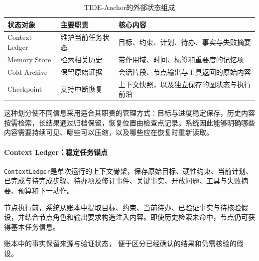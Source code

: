 \begin{table}[htbp]
    \centering
    \caption{TIDE-Anchor的外部状态组成}
    \label{tab:anchor_state_objects}
    \begin{tabular}{p{}p{}p{}}
        \toprule
        状态对象 & 主要职责 & 核心内容 \\
        \midrule
        Context Ledger
        & 维护当前任务状态
        & 目标、约束、计划、待办、事实与失败摘要 \\
        Memory Store
        & 检索相关历史
        & 带作用域、时间、标签和重要度的记忆项 \\
        Cold Archive
        & 保留原始证据
        & 会话片段、节点输出与工具返回的原始内容 \\
        Checkpoint
        & 支持中断恢复
        & 上下文快照，以及独立保存的图状态与执行前沿 \\
        \bottomrule
    \end{tabular}
\end{table}

这种划分使不同信息采用适合其职责的管理方式：目标与进度稳定保存，历史内容按需检索，长结果通过归档保留，恢复位置由检查点记录。系统因此能够明确哪些内容需要持续可见、哪些可以压缩，以及哪些应在恢复时重新读取。

\paragraph{Context Ledger：稳定任务锚点}

\texttt{ContextLedger}是单次运行的上下文骨架，保存原始目标、硬性约束、当前计划、已完成与待完成步骤、待办项及修订事件、关键事实、开放问题、工具与失败摘要、预算和下一动作。

节点执行前，系统从账本中提取目标、约束、当前待办、已验证事实与待核验假设，并结合节点角色和输出要求构造注入内容。即使历史检索未命中，节点仍可获得基本任务信息。

账本中的事实保留来源与验证状态，
便于区分已经确认的结果和仍需核验的假设。




